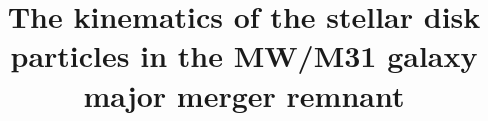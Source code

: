 \documentclass[twocolumn]{aastex63}
\begin{document}
\title{The kinematics of the stellar disk particles in the MW/M31 galaxy major merger remnant}


\end{document}
